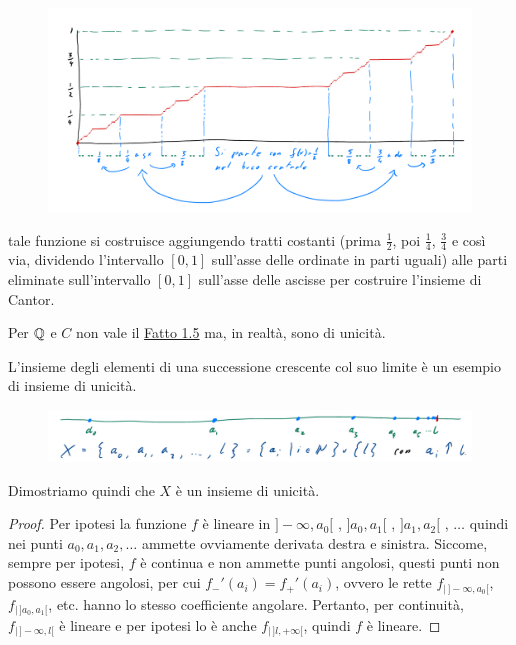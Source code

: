 \begin{figure}[H]
	\centering
	\includegraphics[width=13.5cm]{immagini/scalacantor.png}
\end{figure}

tale funzione si costruisce aggiungendo tratti costanti (prima $\frac 12$, poi $\frac 14$, $\frac 34$ e così via, dividendo l'intervallo $[0,1]$ sull'asse delle ordinate in parti uguali) alle parti eliminate sull'intervallo
$[0,1]$ sull'asse delle ascisse per costruire l'insieme di Cantor.

\begin{note}
Per $\mathbb Q$ e $C$ non vale il \hyperref[unicità]{Fatto 1.5} ma, in realtà, sono di unicità.
\end{note}

\begin{exampleb}[$a_n \uparrow l$]
L'insieme degli elementi di una successione crescente col suo limite è un esempio di insieme di unicità.
\end{exampleb}

\begin{figure}[H]
	\centering
	\includegraphics[scale=0.35]{immagini/succunic.png}
\end{figure}

Dimostriamo quindi che $X$ è un insieme di unicità.
\begin{proof}
Per ipotesi la funzione $f$ è lineare in $]-\infty, a_0[$ , $]a_0,a_1[$ , $]a_1,a_2[$ , $\ldots$ quindi nei punti $a_0,a_1,a_2,\ldots$ ammette ovviamente derivata destra e sinistra. 
Siccome, sempre per ipotesi, $f$ è continua e non ammette punti angolosi, questi punti non possono essere angolosi, per cui $f_{-}'(a_i) = f_{+}'(a_i)$, ovvero le rette $f_{|\,]-\infty, a_0[}$, $f_{|\,]a_0,a_1[}$, etc. hanno lo stesso coefficiente angolare.
Pertanto, per continuità, $f_{|\,]-\infty, l[}$ è lineare e per ipotesi lo è anche $f_{|\,]l,+\infty[}$, quindi $f$ è lineare.
\end{proof}

